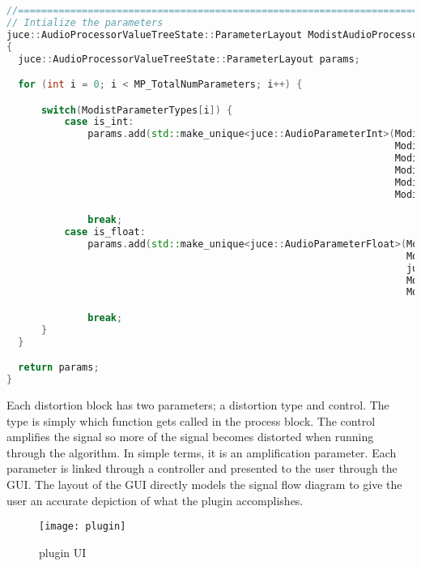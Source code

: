 \documentclass{article}
\begin{document}
\begin{lstlisting}[language=C++]
//==============================================================================
// Intialize the parameters
juce::AudioProcessorValueTreeState::ParameterLayout ModistAudioProcessor::createParameterLayout()
{
  juce::AudioProcessorValueTreeState::ParameterLayout params;

  for (int i = 0; i < MP_TotalNumParameters; i++) {

      switch(ModistParameterTypes[i]) {
          case is_int:
              params.add(std::make_unique<juce::AudioParameterInt>(ModistParameterID[i],
                                                                   ModistParameterID[i],
                                                                   ModistParameterMin[i],
                                                                   ModistParameterMax[i],
                                                                   ModistParameterDefault[i],
                                                                   ModistParameterID[i]));

              break;
          case is_float:
              params.add(std::make_unique<juce::AudioParameterFloat>(ModistParameterID[i],
                                                                     ModistParameterID[i],
                                                                     juce::NormalisableRange<float>(ModistParameterMin[i], ModistParameterMax[i]),
                                                                     ModistParameterDefault[i],
                                                                     ModistParameterID[i]));

              break;
      }
  }

  return params;
}

\end{lstlisting}

Each distortion block has two parameters; a distortion type and control.
The type is simply which function gets called in the process block. The control
amplifies the signal so more of the signal becomes distorted when running through
the algorithm. In simple terms, it is an amplification parameter. Each parameter is linked through
a controller and presented to the user through the GUI. The layout of the
GUI directly models the signal flow diagram to give the user an accurate depiction
of what the plugin accomplishes.

\begin{figure}[ht]
\centerline{\texttt{[image: plugin]}}
\caption{plugin UI}
\end{figure}
\pagebreak
\end{document}
